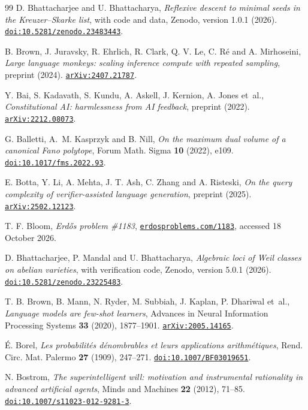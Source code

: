 \begin{thebibliography}{99}
D. Bhattacharjee and U. Bhattacharya,
\emph{Reflexive descent to minimal seeds in the Kreuzer--Skarke list},
with code and data, Zenodo, version 1.0.1 (2026).
\href{https://doi.org/10.5281/zenodo.23483443}{\nolinkurl{doi:10.5281/zenodo.23483443}}.

B. Brown, J. Juravsky, R. Ehrlich, R. Clark, Q. V. Le, C. R\'e and A. Mirhoseini,
\emph{Large language monkeys: scaling inference compute with repeated sampling},
preprint (2024).
\href{https://arxiv.org/abs/2407.21787}{\nolinkurl{arXiv:2407.21787}}.

Y. Bai, S. Kadavath, S. Kundu, A. Askell, J. Kernion, A. Jones et~al.,
\emph{Constitutional AI: harmlessness from AI feedback},
preprint (2022).
\href{https://arxiv.org/abs/2212.08073}{\nolinkurl{arXiv:2212.08073}}.

G. Balletti, A.~M. Kasprzyk and B. Nill,
\emph{On the maximum dual volume of a canonical Fano polytope},
Forum Math. Sigma \textbf{10} (2022), e109.
\href{https://doi.org/10.1017/fms.2022.93}{\nolinkurl{doi:10.1017/fms.2022.93}}.

E. Botta, Y. Li, A. Mehta, J. T. Ash, C. Zhang and A. Risteski,
\emph{On the query complexity of verifier-assisted language generation},
preprint (2025).
\href{https://arxiv.org/abs/2502.12123}{\nolinkurl{arXiv:2502.12123}}.

T. F. Bloom,
\emph{Erd\H{o}s problem \#1183},
\href{https://www.erdosproblems.com/1183}{\nolinkurl{erdosproblems.com/1183}}, accessed 18 October 2026.

D. Bhattacharjee, P. Mandal and U. Bhattacharya,
\emph{Algebraic loci of Weil classes on abelian varieties},
with verification code, Zenodo, version 5.0.1 (2026).
\href{https://doi.org/10.5281/zenodo.23225483}{\nolinkurl{doi:10.5281/zenodo.23225483}}.

T. B. Brown, B. Mann, N. Ryder, M. Subbiah, J. Kaplan, P. Dhariwal et~al.,
\emph{Language models are few-shot learners},
Advances in Neural Information Processing Systems \textbf{33} (2020), 1877--1901.
\href{https://arxiv.org/abs/2005.14165}{\nolinkurl{arXiv:2005.14165}}.

\'E. Borel,
\emph{Les probabilit\'es d\'enombrables et leurs applications arithm\'etiques},
Rend. Circ. Mat. Palermo \textbf{27} (1909), 247--271.
\href{https://doi.org/10.1007/BF03019651}{\nolinkurl{doi:10.1007/BF03019651}}.

N. Bostrom,
\emph{The superintelligent will: motivation and instrumental rationality in advanced artificial agents},
Minds and Machines \textbf{22} (2012), 71--85.
\href{https://doi.org/10.1007/s11023-012-9281-3}{\nolinkurl{doi:10.1007/s11023-012-9281-3}}.


\end{thebibliography}
